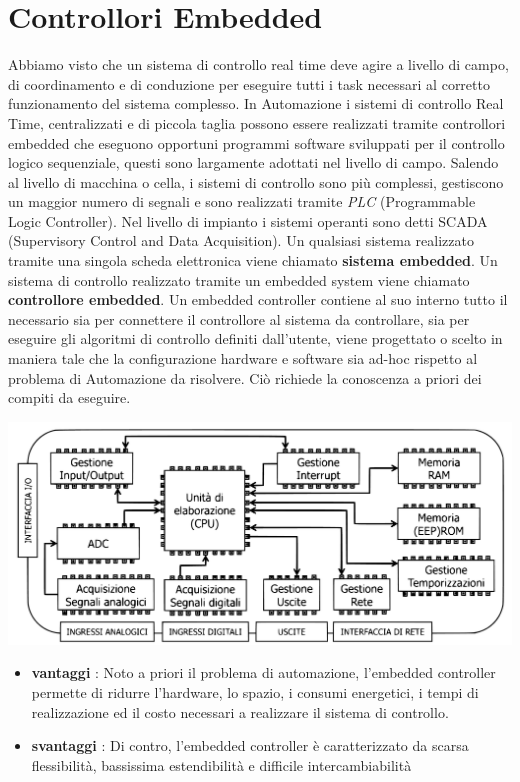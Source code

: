 \documentclass[10pt, letterpaper]{report}
\begin{document}
\section{Controllori Embedded}
Abbiamo visto che un sistema di controllo real time deve agire a livello di campo, di
coordinamento e di conduzione per eseguire tutti i task necessari al corretto
funzionamento del sistema complesso. In Automazione i sistemi di controllo Real Time, centralizzati e di piccola
taglia possono essere realizzati tramite controllori embedded che eseguono
opportuni programmi software sviluppati per il controllo logico sequenziale, questi sono largamente adottati nel livello di campo. Salendo al livello di macchina o cella, i sistemi di controllo sono più complessi, gestiscono un maggior numero di segnali e sono realizzati tramite \textit{PLC} (Programmable Logic Controller). Nel livello di impianto i sistemi operanti sono detti  SCADA (Supervisory Control and Data Acquisition).\acc 
{} Un qualsiasi sistema realizzato tramite una singola scheda elettronica viene chiamato \textbf{sistema embedded}.\acc 
{} Un sistema di controllo realizzato tramite un embedded system viene chiamato \textbf{controllore embedded}.\acc 
Un embedded controller contiene al suo interno tutto il necessario sia per
connettere il controllore al sistema da controllare, sia per eseguire gli algoritmi di
controllo definiti dall'utente, viene progettato o scelto in maniera tale che la
configurazione hardware e software sia ad-hoc rispetto al problema di Automazione
da risolvere. Ciò richiede la conoscenza a priori dei compiti da eseguire.
\begin{center}
    \includegraphics[width=1\textwidth ]{images/embeddedController.pdf}
\end{center}
\begin{itemize}
    \item \textbf{vantaggi} : Noto a priori il problema di automazione, l'embedded controller permette di ridurre
    l'hardware, lo spazio, i consumi energetici, i tempi di realizzazione ed il costo
    necessari a realizzare il sistema di controllo.
    \item \textbf{svantaggi} : Di contro, l'embedded controller è caratterizzato da scarsa flessibilità, bassissima
    estendibilità e difficile intercambiabilità
\end{itemize}
\end{document}
